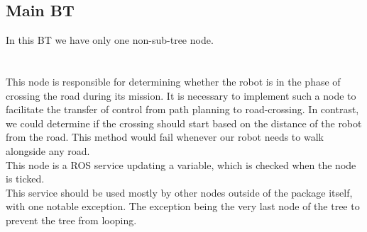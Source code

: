     \subsection{Main BT}
        In this BT we have only one non-sub-tree node.\\\\
        \\
        This node is responsible for determining whether the robot is in the phase of crossing the road during its mission. It is necessary to implement such a node to facilitate the transfer of control from path planning to road-crossing. In contrast, we could determine if the crossing should start based on the distance of the robot from the road. This method would fail whenever our robot needs to walk alongside any road.\\
        This node is a ROS service updating a variable, which is checked when the node is ticked.\\
        This service should be used mostly by other nodes outside of the package itself, with one notable exception. The exception being the very last node of the tree to prevent the tree from looping.
    
    
    
    